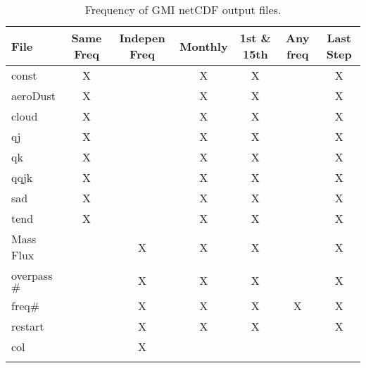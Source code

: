 \begin{center}
\begin{longtable}{|l|c|c|c|c|c|c|} \hline\hline
{\bf File}         &{\bf Same Freq}   &{\bf Indepen Freq}& {\bf Monthly} &  {\bf 1st \& 15th} & {\bf Any freq} & {\bf Last Step} \\ \hline\hline
const        &         X  &            &   X     &     X        &      &  X  \\
aeroDust     &         X  &            &   X     &     X        &      &  X  \\
cloud        &         X  &            &   X     &     X        &      &  X  \\
qj           &         X  &            &   X     &     X        &      &  X  \\
qk           &         X  &            &   X     &     X        &      &  X  \\
qqjk         &         X  &            &   X     &     X        &      &  X  \\
sad          &         X  &            &   X     &     X        &      &  X  \\
tend         &         X  &            &   X     &     X        &      &  X  \\
Mass Flux    &            &      X     &   X     &     X        &      &  X  \\
overpass$\#$ &            &      X     &   X     &     X        &      &  X  \\
freq$\#$     &            &      X     &   X     &     X        &  X   &  X  \\
restart      &            &      X     &   X     &     X        &      &  X      \\
col          &            &      X     &         &              &      &    \\ \hline\hline
\caption{ Frequency of GMI netCDF output files.}
\label{tab:net2}
\end{longtable}
\end{center}
